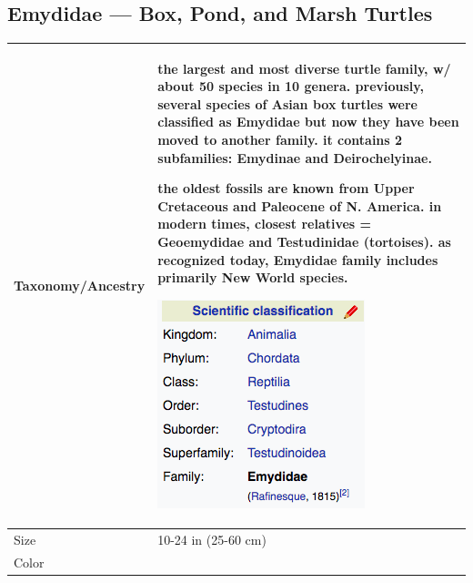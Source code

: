 \subsection{Emydidae --- Box, Pond, and Marsh Turtles}
\begin{center}
\begin{longtabu} to 
	\hline
	Taxonomy/Ancestry &
	the largest and most diverse turtle family, w/ about 50 species in 10 genera. previously, several species of Asian box turtles were classified as Emydidae but now they have been moved to another family. it contains 2 subfamilies: Emydinae and Deirochelyinae.
	
	the oldest fossils are known from Upper Cretaceous and Paleocene of N. America. in modern times, closest relatives = Geoemydidae and Testudinidae (tortoises). as recognized today, Emydidae family includes primarily New World species.
	
	\begin{center} \includegraphics[scale=0.5]{testudines/emydidae/tax} \end{center}
	 \\
	\hline
	Size & 
	10-24 in (25-60 cm)
	\\
	\hline
	Color &
	

\end{longtabu}
\end{center}
